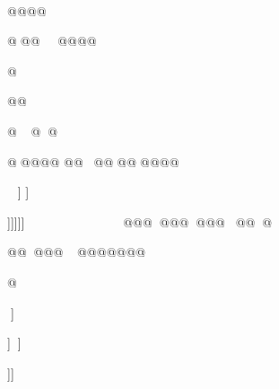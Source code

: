 


@@@@

@@@@@@@






@

@@


















@@@



@@@@@
@@@@@@@@@@







]
]















]]]]]@@@@@@@@@@@@


@@@@@@@@@@@@








@























]







]]





]]

